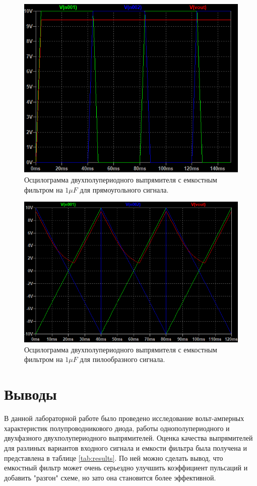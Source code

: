 \begin{figure}[htbp]
    \centering
    \includegraphics[width=0.8\linewidth]{figs/осц_двухпол_выпр_прямоуг.png}
    \caption{Осцилограмма двухполупериодного выпрямителя с емкостным фильтром на $1\mu F$ для прямоугольного сигнала.}
    \label{fig:осцдвухполупериодноговыпрямителясфильтрувелемкпрямоуг}
\end{figure}

\begin{figure}[htbp]
    \centering
    \includegraphics[width=0.8\linewidth]{figs/осц_двухпол_вып_фильтр_пила.png}
    \caption{Осцилограмма двухполупериодного выпрямителя с емкостным фильтром на $1\mu F$ для пилообразного сигнала.}
    \label{fig:осцдвухполупериодноговыпрямителясфильтрпила}
\end{figure}


\section*{Выводы}

В данной лабораторной работе было проведено исследование вольт-амперных характеристик
полупроводникового диода, работы однополупериодного и двухфазного 
двухполупериодного выпрямителей. Оценка качества выпрямителей для разлиных вариантов 
входного сигнала и емкости фильтра была получена и представлена в 
таблице \ref{tab:results}. По ней можно сделать вывод, что емкостный фильтр может очень серьездно
улучшить коэффициент пульсаций и добавить "разгон" схеме, но зато она 
становится более эффективной.

